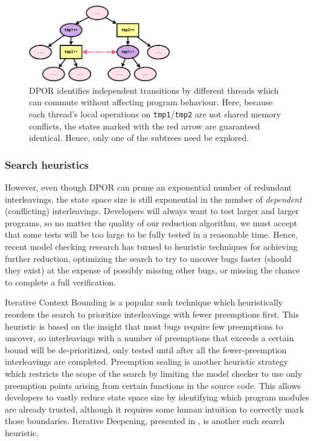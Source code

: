 \begin{figure}[t]
	\begin{center}
	\includegraphics[width=0.55\textwidth]{dpor-new-colors.pdf}
	\end{center}
	\caption[DPOR identifies independent transitions by different threads.]
		{DPOR identifies independent transitions by different threads which can commute
	without affecting program behaviour.
	Here, because each thread's local operations on {\tt tmp1}/{\tt tmp2} are not shared memory conflicts,
	the states marked with the red arrow are guaranteed identical. Hence, only one of the subtrees need be explored.}
	\label{fig:dpor}
\end{figure}

\subsubsection{Search heuristics}

However, even though DPOR can prune an exponential number of redundant interleavings, the state space size is still exponential in the number of {\em dependent} (conflicting) interleavings.
Developers will always want to test larger and larger programs, so no matter the quality of our reduction algorithm,
we must accept that some tests will be too large to be fully tested in a reasonable time.
Hence, recent model checking research has turned to heuristic techniques for achieving further reduction,
optimizing the search to try to uncover bugs faster (should they exist)
at the expense of possibly missing other bugs,
or missing the chance to complete a full verification.

Iterative Context Bounding \cite{chess-icb} is a popular such technique which heuristically reorders the search to prioritize interleavings with fewer preemptions first.
This heuristic is based on the insight that most bugs require few preemptions to uncover, so interleavings with a number of preemptions that exceeds a certain bound will be de-prioritized, only tested until after all the fewer-preemption interleavings are completed.
Preemption sealing \cite{sealing} is another heuristic strategy which restricts the scope of the search by limiting the model checker to use only preemption points arising from certain functions in the source code.
This allows developers to vastly reduce state space size by identifying which program modules are already trusted,
although it requires some human intuition to correctly mark those boundaries.
Iterative Deepening, presented in , is another such search heuristic.

